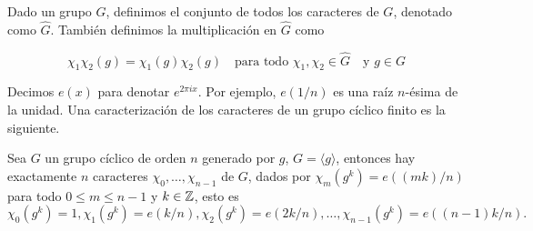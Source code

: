  \begin{definition}
 Dado un grupo $G$, definimos el conjunto de todos los caracteres de $G$, denotado como $\widehat{G}$. También definimos la multiplicación en $\widehat{G}$ como

$$\chi_1\chi_2(g)=\chi_1(g)\chi_2(g) \quad \text{para todo } \chi_1,\chi_2\in \widehat{G} \quad \text{y } g\in G$$

 \end{definition}

Decimos $e(x)$ para denotar $e^{2 \pi i x}$. Por ejemplo, $e(1 / n)$ es una raíz $n$-ésima de la unidad. Una caracterización de los caracteres de un grupo cíclico finito es la siguiente.

\begin{theorem}
Sea $G$ un grupo cíclico de orden $n$ generado por $g$, $G=\langle g\rangle$, entonces hay exactamente $n$ caracteres $\chi_0,\ldots,\chi_{n-1}$ de $G$, dados por $\chi_m(g^k)=e\left((mk)/n\right)$ para todo $0\leq m\leq n-1$ y $k\in \mathbb{Z}$, esto es 
$$\chi_0(g^k)=1, \chi_1(g^k)=e(k/n),\chi_2(g^k)=e(2k/n),\ldots,\chi_{n-1}(g^k)=e((n-1)k/n).$$
\end{theorem}

